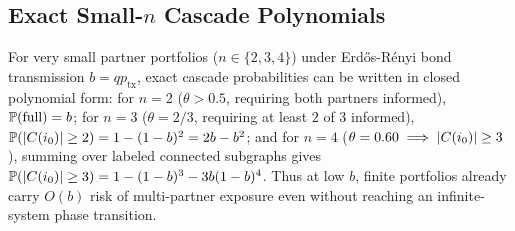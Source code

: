 \subsection{Exact Small-\texorpdfstring{$n$}{n} Cascade Polynomials}
\label{subsec:cas-small-n}

\noindent\layermath{} For very small partner portfolios ($n \in \{2, 3, 4\}$) under
Erd\H{o}s-R\'enyi bond transmission $b = q p_{\mathrm{tx}}$, exact cascade probabilities
can be written in closed polynomial form:
for $n = 2$ ($\theta > 0.5$, requiring both partners informed), $\mathbb{P}(\text{full}) = b$;
for $n = 3$ ($\theta = 2/3$, requiring at least $2$ of $3$ informed),
$\mathbb{P}(\lvert C(i_0) \rvert \ge 2) = 1 - (1 - b)^2 = 2b - b^2$;
and for $n = 4$ ($\theta = 0.60 \implies \lvert C(i_0) \rvert \ge 3$), summing over labeled
connected subgraphs gives $\mathbb{P}(\lvert C(i_0) \rvert \ge 3) = 1 - (1 - b)^3 - 3 b (1 - b)^4$.
Thus at low $b$, finite portfolios already carry $O(b)$ risk of multi-partner exposure even
without reaching an infinite-system phase transition.
